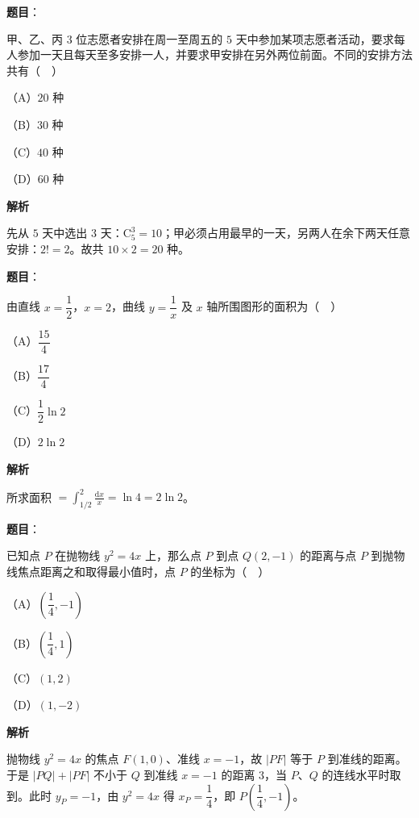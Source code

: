 \begin{answer}

\textbf{题目}：

甲、乙、丙 $3$ 位志愿者安排在周一至周五的 $5$ 天中参加某项志愿者活动，要求每人参加一天且每天至多安排一人，并要求甲安排在另外两位前面。不同的安排方法共有（　）

（A）$20$ 种

（B）$30$ 种

（C）$40$ 种

（D）$60$ 种

\textbf{解析}

先从 $5$ 天中选出 $3$ 天：$\mathrm C_5^3=10$；甲必须占用最早的一天，另两人在余下两天任意安排：$2!=2$。故共 $10\times2=20$ 种。


\end{answer}
\begin{answer}

\textbf{题目}：

由直线 $x=\dfrac12$，$x=2$，曲线 $y=\dfrac1x$ 及 $x$ 轴所围图形的面积为（　）

（A）$\dfrac{15}4$

（B）$\dfrac{17}4$

（C）$\dfrac12\ln2$

（D）$2\ln2$

\textbf{解析}

所求面积 $=\displaystyle\int_{1/2}^{2}\frac{\mathrm dx}x=\ln4=2\ln2$。


\end{answer}
\begin{answer}

\textbf{题目}：

已知点 $P$ 在抛物线 $y^2=4x$ 上，那么点 $P$ 到点 $Q(2,-1)$ 的距离与点 $P$ 到抛物线焦点距离之和取得最小值时，点 $P$ 的坐标为（　）

（A）$\left(\dfrac14,-1\right)$

（B）$\left(\dfrac14,1\right)$

（C）$(1,2)$

（D）$(1,-2)$

\textbf{解析}

抛物线 $y^2=4x$ 的焦点 $F(1,0)$、准线 $x=-1$，故 $|PF|$ 等于 $P$ 到准线的距离。于是 $|PQ|+|PF|$ 不小于 $Q$ 到准线 $x=-1$ 的距离 $3$，当 $P$、$Q$ 的连线水平时取到。此时 $y_P=-1$，由 $y^2=4x$ 得 $x_P=\dfrac14$，即 $P\left(\dfrac14,-1\right)$。


\end{answer}
